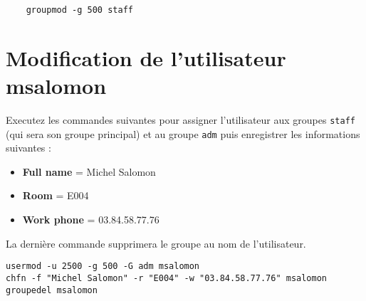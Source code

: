 \begin{lstlisting}
	groupmod -g 500 staff
\end{lstlisting}

\section{Modification de l'utilisateur msalomon}

Executez les commandes suivantes pour assigner l'utilisateur aux groupes \texttt{staff} (qui sera son groupe principal) et au groupe \texttt{adm} puis enregistrer les informations suivantes :
\begin{itemize}
	\item \textbf{Full name} = Michel Salomon
	\item \textbf{Room} = E004
	\item \textbf{Work phone} = 03.84.58.77.76
\end{itemize}
La dernière commande supprimera le groupe au nom de l'utilisateur.

\begin{lstlisting}
usermod -u 2500 -g 500 -G adm msalomon
chfn -f "Michel Salomon" -r "E004" -w "03.84.58.77.76" msalomon
groupedel msalomon
\end{lstlisting}

